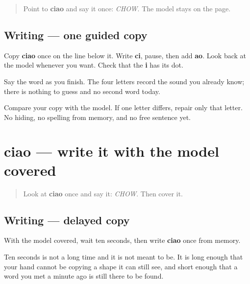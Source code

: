 \label{lesson:IT-W01-ciao-guided-copy}



\begin{quote}
Point to \textbf{ciao} and say it once: \emph{CHOW}. The model stays on the page.
\end{quote}

\subsection*{Writing — one guided copy}

Copy \textbf{ciao} once on the line below it. Write \textbf{ci}, pause, then add \textbf{ao}. Look back at the model whenever you want. Check that the \textbf{i} has its dot.

Say the word as you finish. The four letters record the sound you already know; there is nothing to guess and no second word today.

\begin{tcolorbox}[breakable,colback=teal!4,colframe=teal!35!black,title={Before you move on}]
Compare your copy with the model. If one letter differs, repair only that letter. No hiding, no spelling from memory, and no free sentence yet.
\end{tcolorbox}
\section[ciao]{ciao — write it with the model covered}

\label{lesson:IT-W01-ciao-delayed-copy}



\begin{quote}
Look at \textbf{ciao} once and say it: \emph{CHOW}. Then cover it.
\end{quote}

\subsection*{Writing — delayed copy}

With the model covered, wait ten seconds, then write \textbf{ciao} once from memory.

Ten seconds is not a long time and it is not meant to be. It is long enough that your hand cannot be copying a shape it can still see, and short enough that a word you met a minute ago is still there to be found.

